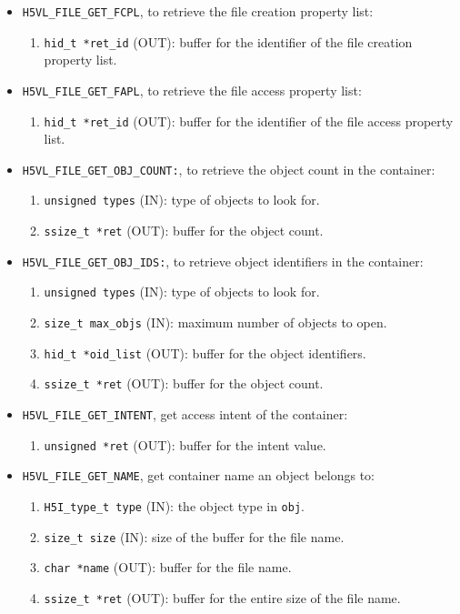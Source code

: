 \begin{itemize}
\item {\tt H5VL\_FILE\_GET\_FCPL}, to retrieve the file creation
  property list:
  \begin{enumerate}
  \item {\tt hid\_t *ret\_id} (OUT): buffer for the identifier of the
    file creation property list.
  \end{enumerate}

\item {\tt H5VL\_FILE\_GET\_FAPL}, to retrieve the file access
  property list:
  \begin{enumerate}
  \item {\tt hid\_t *ret\_id} (OUT): buffer for the identifier of the
    file access property list.
  \end{enumerate}

\item {\tt H5VL\_FILE\_GET\_OBJ\_COUNT:}, to retrieve the object count
  in the container:
  \begin{enumerate}
  \item {\tt unsigned types} (IN): type of objects to look for.
  \item {\tt ssize\_t *ret} (OUT): buffer for the object count.
  \end{enumerate}

\item {\tt H5VL\_FILE\_GET\_OBJ\_IDS:}, to retrieve object identifiers
  in the container:
  \begin{enumerate}
  \item {\tt unsigned types} (IN): type of objects to look for.
  \item {\tt size\_t max\_objs} (IN): maximum number of objects to
    open.
  \item {\tt hid\_t *oid\_list} (OUT): buffer for the object identifiers.
  \item {\tt ssize\_t *ret} (OUT): buffer for the object count.
  \end{enumerate}

\item {\tt H5VL\_FILE\_GET\_INTENT}, get access intent of the
  container:
  \begin{enumerate}
  \item {\tt unsigned *ret} (OUT): buffer for the intent value.
  \end{enumerate}

\item {\tt H5VL\_FILE\_GET\_NAME}, get container name an object
  belongs to:
  \begin{enumerate}
  \item {\tt H5I\_type\_t type} (IN): the object type in {\tt obj}.
  \item {\tt size\_t size} (IN): size of the buffer for the file name.
  \item {\tt char *name} (OUT): buffer for the file name.
  \item {\tt ssize\_t *ret} (OUT): buffer for the entire size of the
    file name.
  \end{enumerate}


\end{itemize}
